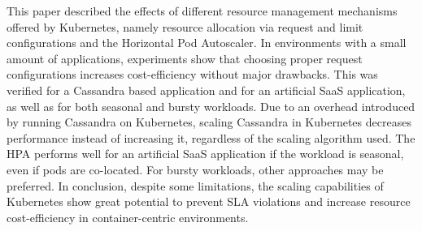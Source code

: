 This paper described the effects of different resource management mechanisms offered by Kubernetes, namely resource allocation via request and limit configurations and the Horizontal Pod Autoscaler. In environments with a small amount of applications, experiments show that choosing proper request configurations increases cost-efficiency without major drawbacks. This was verified for a Cassandra based application and for an artificial SaaS application, as well as for both seasonal and bursty workloads. Due to an overhead introduced by running Cassandra on Kubernetes, scaling Cassandra in Kubernetes decreases performance instead of increasing it, regardless of the scaling algorithm used. The HPA performs well for an artificial SaaS application if the workload is seasonal, even if pods are co-located. For bursty workloads, other approaches may be preferred. In conclusion, despite some limitations, the scaling capabilities of Kubernetes show great potential to prevent SLA violations and increase resource cost-efficiency in container-centric environments.




